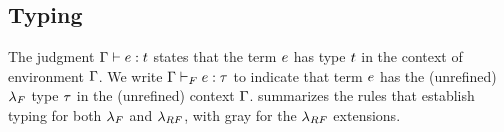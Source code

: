 %

\subsection{Typing}
\label{sec:typing:typ}

The judgment ${\mathrm{\Gamma}} \vdash {\ensuremath{e}} : {t}$ states
that the term $e$ has type $t$ in the context of
environment $\mathrm{\Gamma}$.
%
We write ${\mathrm{\Gamma}} \vdash_F {e} : {\tau}$
to indicate that term $e$ has the (unrefined)
$\lambda_{F}$ type $\tau$ in the (unrefined) context
$\mathrm{\Gamma}$.
%
 summarizes
the rules that establish typing for both $\lambda_{F}$ and
$\lambda_{RF}$, with gray %
for the $\lambda_{RF}$ extensions.

